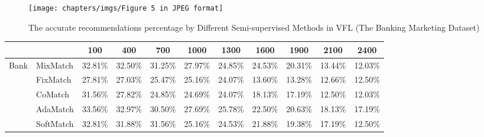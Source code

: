 \begin{figure}[!htbp]
	\centering
	\captionsetup{size=footnotesize}
	\texttt{[image: chapters/imgs/Figure 5 in JPEG format]}
	\caption{The accurate recommendations percentage by Different Semi-supervised Methods in VFL (The Banking Marketing Dataset)}
	\label{fig:GBDT}
\end{figure}









\begin{table}
	\centering
	\label{RQ3.1}
	\begin{tabular}{llccccccccc} 
	\hline
	\multicolumn{2}{l}{\diagbox{{Datasets \& Methods}{$num$}}}                                        & 100              & 400              & 700              & 1000             & 1300             & 1600             & 1900             & 2100             & 2400              \\ 
	\hline
	\multirow{10}{*}{Bank}   & MixMatch                         & 32.81\%          & 32.50\%          & 31.25\%          & 27.97\%          & 24.85\%          & 24.53\%          & 20.31\%          & 13.44\%          & 12.03\%           \\
							 & FixMatch                         & 27.81\%          & 27.03\%          & 25.47\%          & 25.16\%          & 24.07\%          & 13.60\%          & 13.28\%          & 12.66\%          & 12.50\%           \\
							 & CoMatch                          & 31.56\%          & 27.82\%          & 24.85\%          & 24.69\%          & 24.07\%          & 18.13\%          & 17.19\%          & 12.50\%          & 12.03\%           \\
							 & AdaMatch                         & 33.56\%          & 32.97\%          & 30.50\%          & 27.69\%          & 25.78\%          & 22.50\%          & 20.63\%          & 18.13\%          & 17.19\%           \\
							 & SoftMatch                        & 32.81\%          & 31.88\%          & 31.56\%          & 25.16\%          & 24.53\%          & 21.88\%          & 19.38\%          & 17.19\%          & 12.50\%           \\

\end{tabular}
\end{table}
